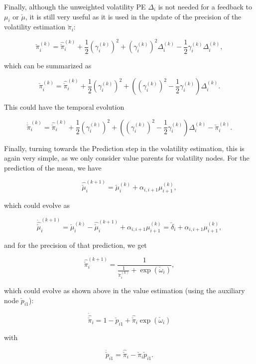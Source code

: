 Finally, although the unweighted volatility PE $\Delta_i$ is not needed for a feedback to $\mu_i$ or $\check{\mu}$, it is still very useful as it is used in the update of the precision of the volatility estimation $\check{\pi}_i$:

\begin{equation}
	\check{\pi}_i^{(k)} = \hat{\check{\pi}}_i^{(k)} + \frac{1}{2} (\gamma_i^{(k)})^2 + (\gamma_i^{(k)})^2 \Delta_i^{(k)} - \frac{1}{2} \gamma_i^{(k)} \Delta_i^{(k)}, 
\end{equation}

which can be summarized as 

\begin{equation}
	\check{\pi}_i^{(k)} = \hat{\check{\pi}}_i^{(k)} + \frac{1}{2} (\gamma_i^{(k)})^2 + ((\gamma_i^{(k)})^2 - \frac{1}{2} \gamma_i^{(k)}) \Delta_i^{(k)}.
\end{equation}

This could have the temporal evolution

\begin{equation}
	\dot{\check{\pi}}_i^{(k)} = \hat{\check{\pi}}_i^{(k)} + \frac{1}{2} (\gamma_i^{(k)})^2 + ((\gamma_i^{(k)})^2 - \frac{1}{2} \gamma_i^{(k)}) \Delta_i^{(k)} - \check{\pi}_i^{(k)}.
\end{equation}

Finally, turning towards the \textsf{Prediction} step in the volatility estimation, this is again very simple, as we only consider value parents for volatility nodes. For the prediction of the mean, we have

\begin{equation}
	\hat{\check{\mu}}_i^{(k+1)} = \check{\mu}_i^{(k)} + \alpha_{i,i+1} \mu_{i+1}^{(k)}, 
\end{equation}

which could evolve as 

\begin{equation}
	\dot{\hat{\check{\mu}}}_i^{(k+1)} = \check{\mu}_i^{(k)} - \hat{\check{\mu}}_i^{(k+1)} + \alpha_{i,i+1} \mu_{i+1}^{(k)} = \check{\delta}_i + \alpha_{i,i+1} \mu_{i+1}^{(k)}, 
\end{equation}

and for the precision of that prediction, we get

\begin{equation}
  \hat{\check{\pi}}_i^{(k+1)} = \frac{1}{\frac{1}{\check{\pi}_i^{(k)}} + \exp(\check{\omega}_i)}, 
\end{equation}

which could evolve as shown above in the value estimation (using the auxiliary node $\check{p}_{i1}$):

\begin{equation}
	\dot{\hat{\check{\pi}}}_i = 1 - \check{p}_{i1} + \hat{\check{\pi}}_i \exp(\check{\omega}_i)
\end{equation}

with

\begin{equation}
	\dot{\check{p}}_{i1} = \hat{\check{\pi}}_i - \check{\pi}_i \check{p}_{i1}. 
\end{equation}

